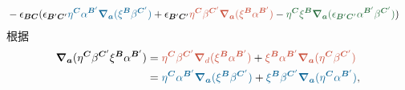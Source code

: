 \begin{equation*}
\begin{aligned}
		& -\epsilon _{\boldsymbol{BC}} (\epsilon _{\boldsymbol{B} '\boldsymbol{C} '}\textcolor{roulan}{\eta }\textcolor{roulan}{^{\boldsymbol{C}}}\textcolor{roulan}{\alpha }\textcolor{roulan}{^{\boldsymbol{B} '}}\boldsymbol{\textcolor{roulan}{\nabla }}\textcolor{roulan}{_{\boldsymbol{a}}}\textcolor{roulan}{(\xi }\textcolor{roulan}{^{\boldsymbol{B}}}\textcolor{roulan}{\beta }\textcolor{roulan}{^{\boldsymbol{C} '}}\textcolor{roulan}{)} +\epsilon _{\boldsymbol{B} '\boldsymbol{C} '}\textcolor{mulan}{\eta }\textcolor{mulan}{^{\boldsymbol{C}}}\textcolor{mulan}{\beta }\textcolor{mulan}{^{\boldsymbol{C} '}}\boldsymbol{\textcolor{mulan}{\nabla }}\textcolor{mulan}{_{\boldsymbol{a}}}\textcolor{mulan}{(\xi }\textcolor{mulan}{^{\boldsymbol{B}}}\textcolor{mulan}{\alpha }\textcolor{mulan}{^{\boldsymbol{B} '}}\textcolor{mulan}{)} -\textcolor{guanlv}{\eta }\textcolor{guanlv}{^{\boldsymbol{C}}}\textcolor{guanlv}{\xi }\textcolor{guanlv}{^{\boldsymbol{B}}}\boldsymbol{\textcolor{guanlv}{\nabla }}\textcolor{guanlv}{_{\boldsymbol{a}}}\textcolor{guanlv}{(\epsilon }\textcolor{guanlv}{_{\boldsymbol{B} '\boldsymbol{C} '}}\textcolor{guanlv}{\alpha }\textcolor{guanlv}{^{\boldsymbol{B} '}}\textcolor{guanlv}{\beta }\textcolor{guanlv}{^{\boldsymbol{C} '}}\textcolor{guanlv}{)} )
	\end{aligned}
\end{equation*}
根据
\begin{equation*}
	\begin{aligned}
		\boldsymbol{\nabla }_{\boldsymbol{a}} (\eta ^{\boldsymbol{C}} \beta ^{\boldsymbol{C} '} \xi ^{\boldsymbol{B}} \alpha ^{\boldsymbol{B} '} ) & =\textcolor{mulan}{\eta }\textcolor{mulan}{^{\boldsymbol{C}}}\textcolor{mulan}{\beta }\textcolor{mulan}{^{\boldsymbol{C} '}}\boldsymbol{\textcolor{mulan}{\nabla }}\textcolor{mulan}{_{d}}\textcolor{mulan}{(\xi }\textcolor{mulan}{^{\boldsymbol{B}}}\textcolor{mulan}{\alpha }\textcolor{mulan}{^{\boldsymbol{B} '}}\textcolor{mulan}{)} +\textcolor{mulan}{\xi }\textcolor{mulan}{^{\boldsymbol{B}}}\textcolor{mulan}{\alpha }\textcolor{mulan}{^{\boldsymbol{B} '}}\boldsymbol{\textcolor{mulan}{\nabla }}\textcolor{mulan}{_{\boldsymbol{a}}}\textcolor{mulan}{(\eta }\textcolor{mulan}{^{\boldsymbol{C}}}\textcolor{mulan}{\beta }\textcolor{mulan}{^{\boldsymbol{C} '}}\textcolor{mulan}{)}\\
		& =\textcolor{roulan}{\eta }\textcolor{roulan}{^{\boldsymbol{C}}}\textcolor{roulan}{\alpha }\textcolor{roulan}{^{\boldsymbol{B} '}}\boldsymbol{\textcolor{roulan}{\nabla }}\textcolor{roulan}{_{\boldsymbol{a}}}\textcolor{roulan}{(\xi }\textcolor{roulan}{^{\boldsymbol{B}}}\textcolor{roulan}{\beta }\textcolor{roulan}{^{\boldsymbol{C} '}}\textcolor{roulan}{)} +\textcolor{roulan}{\xi }\textcolor{roulan}{^{\boldsymbol{B}}}\textcolor{roulan}{\beta }\textcolor{roulan}{^{\boldsymbol{C} '}}\boldsymbol{\textcolor{roulan}{\nabla }}\textcolor{roulan}{_{\boldsymbol{a}}}\textcolor{roulan}{(\eta }\textcolor{roulan}{^{\boldsymbol{C}}}\textcolor{roulan}{\alpha }\textcolor{roulan}{^{\boldsymbol{B} '}}\textcolor{roulan}{)} ,
	\end{aligned}
\end{equation*}
